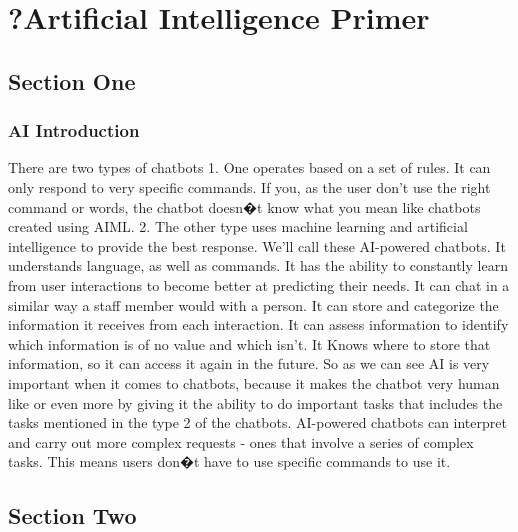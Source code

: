\chapter{?Artificial Intelligence Primer}
\label{chap:chap2}

\section{Section One}

  \subsection{AI Introduction}
There are two types of chatbots
1. One operates based on a set of rules. It can only respond to very specific commands. If you, as the user don't use the right command or words, the chatbot doesn�t know what you mean like chatbots created using AIML.
2. The other type uses machine learning and artificial intelligence to provide the best response. We'll call these AI-powered chatbots. 
It understands language, as well as commands.
It has the ability to constantly learn from user interactions to become better at predicting their needs. 
It can chat in a similar way a staff member would with a person. 
It can store and categorize the information it receives from each interaction. 
It can assess information to identify which information is of no value and which isn't. 
It Knows where to store that information, so it can access it again in the future.
So as we can see AI is very important when it comes to chatbots, because it makes the chatbot very human like or even more by giving it the ability to do important tasks that includes the tasks mentioned in the type 2 of the chatbots.
AI-powered chatbots can interpret and carry out more complex requests - ones that involve a series of complex tasks. This means users don�t have to use specific commands to use it.

\section{Section Two}

